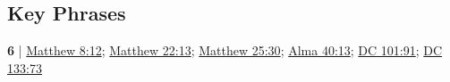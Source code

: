 \subsection{Key Phrases} %
	\label{DARKNESS-PHRASES}

	\begin{compactdesc}
	
		\item[outer darkness] \textbf{6} | \hyperref[MATTHEW-8-12]{Matthew 8:12}; \hyperref[MATTHEW-22-13]{Matthew 22:13}; \hyperref[MATTHEW-25-30]{Matthew 25:30}; \hyperref[ALMA-40-13]{Alma 40:13}; \hyperref[DC101-91]{DC 101:91}; \hyperref[DC133-73]{DC 133:73}
			
			
	\end{compactdesc}
	


